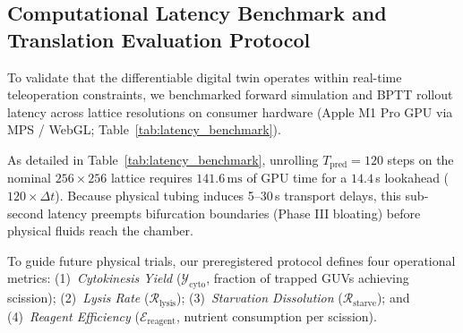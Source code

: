 \documentclass{article}
\begin{document}
\subsection{Computational Latency Benchmark and Translation Evaluation Protocol}
To validate that the differentiable digital twin operates within real-time teleoperation constraints, we benchmarked forward simulation and BPTT rollout latency across lattice resolutions on consumer hardware (Apple M1 Pro GPU via MPS / WebGL; Table~\ref{tab:latency_benchmark}).

\begin{table}[h]
\centering
\caption{\textbf{Computational Latency and Predictive Horizon Benchmark of the \texttt{cgen} Digital Twin.}}
\label{tab:latency_benchmark}
\vspace{1mm}
\vspace{-1mm}
\end{table}

As detailed in Table~\ref{tab:latency_benchmark}, unrolling $T_{\text{pred}} = 120$ steps on the nominal $256 \times 256$ lattice requires $141.6\,\text{ms}$ of GPU time for a $14.4$\,s lookahead ($120 \times \Delta t$). Because physical tubing induces 5--30\,s transport delays, this sub-second latency preempts bifurcation boundaries (Phase III bloating) before physical fluids reach the chamber.

To guide future physical trials, our preregistered protocol defines four operational metrics: (1)~\textit{Cytokinesis Yield} ($\mathcal{Y}_{\text{cyto}}$, fraction of trapped GUVs achieving scission); (2)~\textit{Lysis Rate} ($\mathcal{R}_{\text{lysis}}$); (3)~\textit{Starvation Dissolution} ($\mathcal{R}_{\text{starve}}$); and (4)~\textit{Reagent Efficiency} ($\mathcal{E}_{\text{reagent}}$, nutrient consumption per scission).
\end{document}
